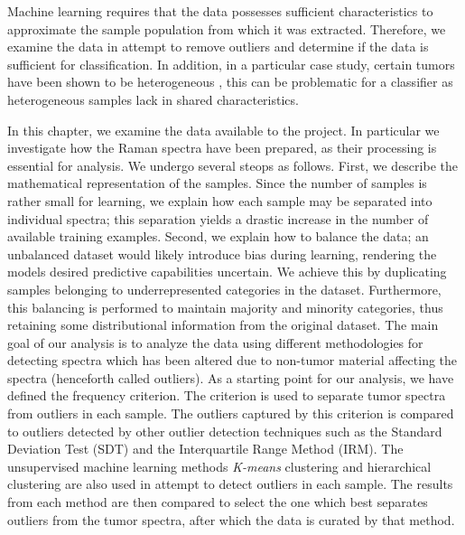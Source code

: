 Machine learning requires that the data possesses sufficient characteristics to approximate the sample population from which it was extracted. Therefore, we examine the data in attempt to remove outliers and determine if the data is sufficient for classification. In addition, in a particular case study, certain tumors have been shown to be heterogeneous \cite{friedmann2014glioblastoma}, this can be problematic for a classifier as heterogeneous samples lack in shared characteristics. 

In this chapter, we examine the data available to the project. In particular we investigate how the Raman spectra have been prepared, as their processing is essential for analysis. We undergo several steops as follows. First, we describe the mathematical representation of the samples. Since the number of samples is rather small for learning, we explain how each sample may be separated into individual spectra; this separation yields a drastic increase in the number of available training examples. Second, we explain how to balance the data; an unbalanced dataset would likely introduce bias during learning, rendering the models desired predictive capabilities uncertain. We achieve this by duplicating samples belonging to underrepresented categories in the dataset. Furthermore, this balancing is performed to maintain majority and minority categories, thus retaining some distributional information from the original dataset. The main goal of our analysis is to analyze the data using different methodologies for detecting spectra which has been altered due to non-tumor material affecting the spectra (henceforth called outliers). As a starting point for our analysis, we have defined the frequency criterion. The criterion is used to separate tumor spectra from outliers in each sample. The outliers captured by this criterion is compared to outliers detected by other outlier detection techniques such as the Standard Deviation Test (SDT) and the Interquartile Range Method (IRM). The unsupervised machine learning methods \textit{K-means} clustering and hierarchical clustering are also used in attempt to detect outliers in each sample. The results from each method are then compared to select the one which best separates outliers from the tumor spectra, after which the data is curated by that method.

